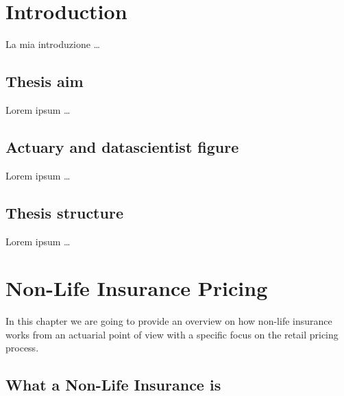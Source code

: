 \documentclass[a4paper, twoside, openright, 12pt]{report}
\theoremstyle{definition}
\theoremstyle{definition}
\theoremstyle{definition}
\theoremstyle{remark}
\begin{document}
\hypertarget{introduction}{%
\chapter*{Introduction}\label{introduction}}


La mia introduzione \ldots{}

\hypertarget{thesis-aim}{%
\section*{Thesis aim}\label{thesis-aim}}

Lorem ipsum \ldots{}

\hypertarget{actuary-and-datascientist-figure}{%
\section*{Actuary and datascientist figure}\label{actuary-and-datascientist-figure}}

Lorem ipsum \ldots{}

\hypertarget{thesis-structure}{%
\section*{Thesis structure}\label{thesis-structure}}

Lorem ipsum \ldots{}

\hypertarget{chap:nlip-ita-market}{%
\chapter{Non-Life Insurance Pricing}\label{chap:nlip-ita-market}}

\minitoc  


In this chapter we are going to provide an overview on how non-life insurance works from an actuarial point of view with a specific focus on the retail pricing process.

\hypertarget{chap:non-life-ins}{%
\section{What a Non-Life Insurance is}\label{chap:non-life-ins}}
\end{document}
